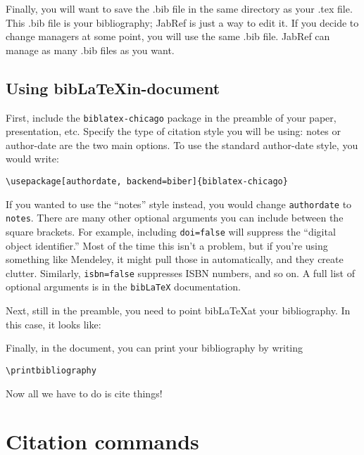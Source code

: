\documentclass[12pt]{article}
\begin{document}
Finally, you will want to save the .bib file in the same directory as your .tex file. This .bib file is your bibliography; JabRef is just a way to edit it. If you decide to change managers at some point, you will use the same .bib file. JabRef can manage as many .bib files as you want.

\subsection{Using bib\LaTeX in-document}

First, include the \verb+biblatex-chicago+ package in the preamble of your paper, presentation, etc. Specify the type of citation style you will be using: notes or author-date are the two main options. To use the standard author-date style, you would write:

\verb+\usepackage[authordate, backend=biber]{biblatex-chicago}+

If you wanted to use the ``notes'' style instead, you would change \verb+authordate+ to \verb+notes+. There are many other optional arguments you can include between the square brackets. For example, including \verb+doi=false+ will suppress the ``digital object identifier.'' Most of the time this isn't a problem, but if you're using something like Mendeley, it might pull those in automatically, and they create clutter. Similarly, \verb+isbn=false+ suppresses ISBN numbers, and so on. A full list of optional arguments is in the \verb+bibLaTeX+ documentation.

Next, still in the preamble, you need to point bib\LaTeX at your bibliography. In this case, it looks like:

\verb++

Finally, in the document, you can print your bibliography by writing

\verb+\printbibliography+

Now all we have to do is cite things!

\section{Citation commands}
\end{document}
